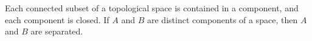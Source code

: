 Each connected subset of a topological space is contained in a component, and each component is closed. If $A$ and $B$ are distinct components of a space, then $A$ and $B$ are separated.
